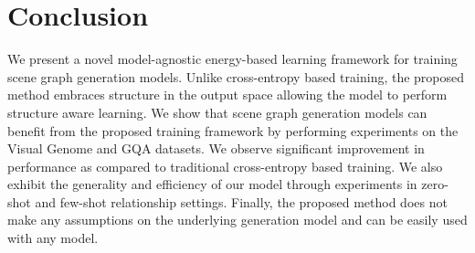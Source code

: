 \documentclass[final]{cvpr}
\begin{document}
\section{Conclusion}
We present a novel model-agnostic energy-based learning framework for training scene graph generation models. Unlike cross-entropy based training, the proposed method embraces structure in the output space allowing the model to perform structure aware learning. We show that scene graph generation models can benefit from the proposed training framework by performing experiments on the Visual Genome and GQA datasets. We observe significant improvement in performance as compared to traditional cross-entropy based training. We also exhibit the generality and efficiency of our model through experiments in zero-shot and few-shot relationship settings. Finally, the proposed method does not make any assumptions on the underlying generation model and can be easily used with any model.



{\small


}
\end{document}
